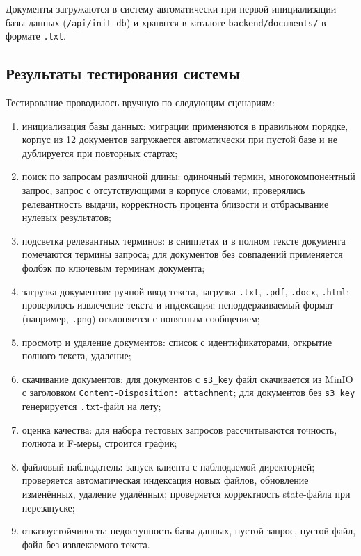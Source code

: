 Документы загружаются в систему автоматически при первой инициализации базы данных
(\texttt{/api/init-db}) и хранятся в каталоге \texttt{backend/documents/} в формате
\texttt{.txt}.

\subsection{Результаты тестирования системы}

Тестирование проводилось вручную по следующим сценариям:

\begin{enumerate}
	\item инициализация базы данных: миграции применяются в правильном порядке, корпус из 12 документов загружается автоматически при пустой базе и не дублируется при повторных стартах;
	\item поиск по запросам различной длины: одиночный термин, многокомпонентный запрос, запрос с отсутствующими в корпусе словами; проверялись релевантность выдачи, корректность процента близости и отбрасывание нулевых результатов;
	\item подсветка релевантных терминов: в сниппетах и в полном тексте документа помечаются термины запроса; для документов без совпадений применяется фолбэк по ключевым терминам документа;
	\item загрузка документов: ручной ввод текста, загрузка \texttt{.txt}, \texttt{.pdf}, \texttt{.docx}, \texttt{.html}; проверялось извлечение текста и индексация; неподдерживаемый формат (например, \texttt{.png}) отклоняется с понятным сообщением;
	\item просмотр и удаление документов: список с идентификаторами, открытие полного текста, удаление;
	\item скачивание документов: для документов с \texttt{s3\_key} файл скачивается из MinIO с заголовком \texttt{Content-Disposition: attachment}; для документов без \texttt{s3\_key} генерируется \texttt{.txt}-файл на лету;
	\item оценка качества: для набора тестовых запросов рассчитываются точность, полнота и F-меры, строится график;
	\item файловый наблюдатель: запуск клиента с наблюдаемой директорией; проверяется автоматическая индексация новых файлов, обновление изменённых, удаление удалённых; проверяется корректность state-файла при перезапуске;
	\item отказоустойчивость: недоступность базы данных, пустой запрос, пустой файл, файл без извлекаемого текста.
\end{enumerate}


